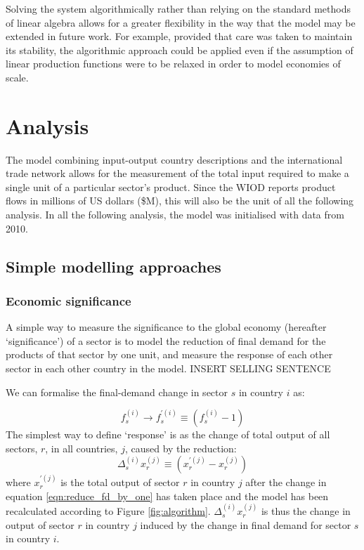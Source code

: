 \documentclass[a4paper]{article}
\begin{document}
Solving the system algorithmically rather than relying on the standard methods of linear algebra allows for a greater flexibility in the way that the model may be extended in future work. For example, provided that care was taken to maintain its stability, the algorithmic approach could be applied even if the assumption of linear production functions were to be relaxed in order to model economies of scale.


\section{Analysis}\label{sec:analysis}
The model combining input-output country descriptions and the international trade network allows for the measurement of the total input required to make a single unit of a particular sector's product.
Since the WIOD reports product flows in millions of US dollars (\$M), this will also be the unit of all the following analysis.
In all the following analysis, the model was initialised with data from 2010.

\subsection{Simple modelling approaches}
\label{ss_simple_modelling_approaches}

\subsubsection*{Economic significance}
A simple way to measure the significance to the global economy (hereafter `significance') of a sector is to model the reduction of final demand for the products of that sector by one unit, and measure the response of each other sector in each other country in the model. INSERT SELLING SENTENCE

We can formalise the final-demand change in sector $s$ in country $i$ as:

\begin{equation}\label{eqn:reduce_fd_by_one}
f_s^{(i)} \rightarrow f_s^{\prime (i)} \equiv (f_s^{(i)} - 1)
\end{equation}
The simplest way to define `response' is as the change of total output of all sectors, $r$, in all countries, $j$, caused by the reduction:
\begin{equation}
\Delta_{s}^{(i)} x_{r}^{(j)} \equiv (x_{r}^{\prime(j)} - x_r^{(j)})
\end{equation}
where $x_{r}^{\prime(j)}$ is the total output of sector $r$ in country $j$ after the change in equation \eqref{eqn:reduce_fd_by_one} has taken place and the model has been recalculated according to Figure \ref{fig:algorithm}.
$\Delta_{s}^{(i)} x_{r}^{(j)}$ is thus the change in output of sector $r$ in country $j$ induced by the change in final demand for sector $s$ in country $i$.
\end{document}
